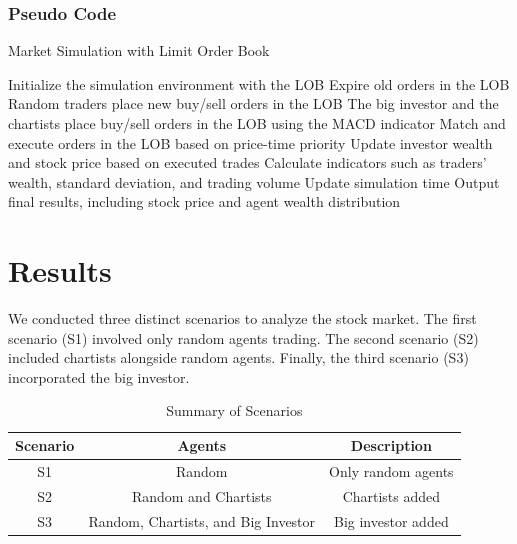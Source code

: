 \documentclass[a4paper, 12pt]{article}
\begin{document}
        \subsubsection{Pseudo Code}
        \begin{algorithm}[H]
        \caption{Market Simulation with Limit Order Book}
        \label{alg:market_simulation}
        \begin{algorithmic}[1]
        \State Initialize the simulation environment with the LOB
        \State Expire old orders in the LOB
        \State Random traders place new buy/sell orders in the LOB
        \State The big investor and the chartists place buy/sell orders in the LOB using the MACD indicator
        \State Match and execute orders in the LOB based on price-time priority
        \State Update investor wealth and stock price based on executed trades
        \State Calculate indicators such as traders' wealth, standard deviation, and trading volume
        \State Update simulation time
        \EndWhile
        \State Output final results, including stock price and agent wealth distribution
        \end{algorithmic}
        \end{algorithm}
        

\section{Results}
We conducted three distinct scenarios to analyze the stock market. The first scenario (S1) involved only random agents trading. The second scenario (S2) included chartists alongside random agents. Finally, the third scenario (S3) incorporated the big investor.\par

\begin{table}[h!]
\centering
\caption{Summary of Scenarios}
\label{tab:scenarios}
\begin{tabular}{@{}ccc@{}}
\toprule
\textbf{Scenario} & \textbf{Agents} & \textbf{Description} \\ \midrule
S1 & Random & Only random agents \\
S2 & Random and Chartists & Chartists added \\
S3 & Random, Chartists, and Big Investor & Big investor added \\ \bottomrule
\end{tabular}
\end{table}
\end{document}
